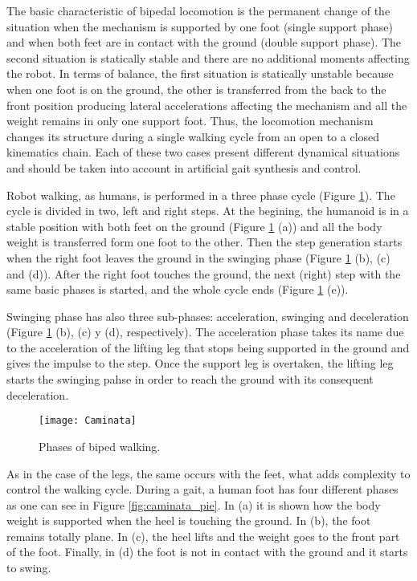 The basic characteristic of bipedal locomotion is the permanent change of the situation when the mechanism is supported by one foot (single support phase) and when both feet are in contact with the ground (double support phase). The second situation is statically stable and there are no additional moments affecting the robot. In terms of balance, the first situation is statically unstable because when one foot is on the ground, the other is transferred from the back to the front position producing lateral accelerations affecting the mechanism and all the weight remains in only one support foot. Thus, the locomotion mechanism changes its structure during a single walking cycle from an open to a closed kinematics chain. Each of these two cases present different dynamical situations and should be taken into account in artificial gait synthesis and control.

Robot walking, as humans, is performed in a three phase cycle (Figure \ref{fig:caminata}). The cycle is divided in two, left and right steps. At the begining, the humanoid is in a stable position with both feet on the ground (Figure \ref{fig:caminata} (a)) and all the body weight is transferred form one foot to the other. Then the step generation starts when the right foot leaves the ground in the swinging phase (Figure \ref{fig:caminata} (b), (c) and (d)). After the right foot touches the ground, the next (right) step with the same basic phases is started, and the whole cycle ends (Figure \ref{fig:caminata} (e)).

Swinging phase has also three sub-phases: acceleration, swinging and deceleration (Figure \ref{fig:caminata} (b), (c) y (d), respectively). The acceleration phase takes its name due to the acceleration of the lifting leg that stops being supported in the ground and gives the impulse to the step. Once the support leg is overtaken, the lifting leg starts the swinging pahse in order to reach the ground with its consequent deceleration.

\begin{figure}[!hbt]
\centering
\texttt{[image: Caminata]}
\caption{Phases of biped walking.}
\label{fig:caminata}
\end{figure}

As in the case of the legs, the same occurs with the feet, what adds complexity to control the walking cycle. During a gait, a human foot has four different phases as one can see in Figure \ref{fig:caminata_pie}. In (a) it is shown how the body weight is supported when the heel is touching the ground. In (b), the foot remains totally plane. In (c), the heel lifts and the weight goes to the front part of the foot. Finally, in (d) the foot is not in contact with the ground and it starts to swing.


